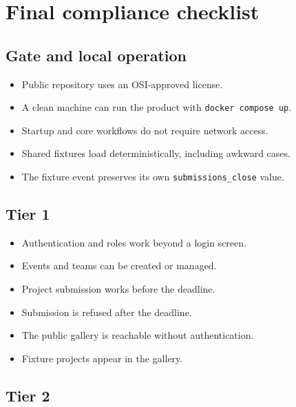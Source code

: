 \documentclass[11pt]{article}
\newcommand{\checkbox}{\textcolor{DeepBlue}{\ding{113}}}
\begin{document}
\section{Final compliance checklist}

\subsection{Gate and local operation}

\begin{itemize}
  \item[\checkbox] Public repository uses an OSI-approved license.
  \item[\checkbox] A clean machine can run the product with \texttt{docker compose up}.
  \item[\checkbox] Startup and core workflows do not require network access.
  \item[\checkbox] Shared fixtures load deterministically, including awkward cases.
  \item[\checkbox] The fixture event preserves its own \texttt{submissions\_close} value.
\end{itemize}

\subsection{Tier 1}

\begin{itemize}
  \item[\checkbox] Authentication and roles work beyond a login screen.
  \item[\checkbox] Events and teams can be created or managed.
  \item[\checkbox] Project submission works before the deadline.
  \item[\checkbox] Submission is refused after the deadline.
  \item[\checkbox] The public gallery is reachable without authentication.
  \item[\checkbox] Fixture projects appear in the gallery.
\end{itemize}

\subsection{Tier 2}
\end{document}

